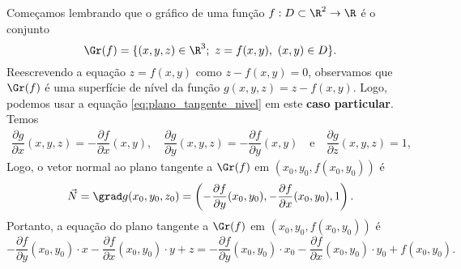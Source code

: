 Começamos lembrando que o gráfico de uma função $f:D\subset \R^2\to \R$ é o conjunto 
$$\Gr(f)=\{(x,y,z)\in\R^3;~z=f(x,y),~(x,y)\in D\}.$$
Reescrevendo a equação $z=f(x,y)$ como $z-f(x,y)=0$, observamos que $\Gr(f)$ é uma superfície de nível da função $g(x,y,z)=z-f(x,y)$. Logo,  podemos usar a equação \eqref{eq:plano_tangente_nivel} em este \textbf{caso particular}. Temos
\begin{align*}
    \dfrac{\partial g}{\partial x}(x,y,z)=-\dfrac{\partial f}{\partial x}(x,y),\quad 
    \dfrac{\partial g}{\partial y}(x,y,z)=-\dfrac{\partial f}{\partial y}(x,y)\quad \mbox{e} \quad 
    \dfrac{\partial g}{\partial z}(x,y,z)=1,
\end{align*}
Logo, o vetor normal ao plano tangente a $\Gr(f)$ em $(x_0,y_0,f(x_0,y_0))$ é 
\begin{equation}\label{vetor_N_grafico}
\Vec{N}=\grad g (x_0,y_0,z_0) = \left(-\dfrac{\partial f}{\partial y}(x_0,y_0),-\dfrac{\partial f}{\partial x}(x_0,y_0),1\right).
\end{equation}
Portanto, a equação do plano tangente a $\Gr(f)$ em $(x_0,y_0,f(x_0,y_0))$ é
\begin{equation}\label{eq:plano_tang_graficos}
-\dfrac{\partial f}{\partial y}(x_0,y_0)\cdot x -\dfrac{\partial f}{\partial x}(x_0,y_0) \cdot y + z = -\dfrac{\partial f}{\partial y}(x_0,y_0)\cdot x_0 -\dfrac{\partial f}{\partial x}(x_0,y_0) \cdot y_0 + f(x_0,y_0).
\end{equation}

